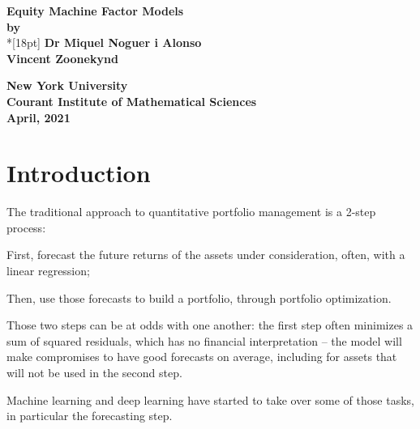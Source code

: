 \documentclass[12pt]{article}
\begin{document}
\begin{center}
\vspace*{.25in}
{\bf\LARGE  { Equity Machine Factor Models }}\\ %
\vspace*{.75in}
{\bf by} \\*[18pt]
\vspace*{.2in}
{\bf Dr Miquel Noguer i Alonso} \\
{\bf Vincent Zoonekynd} \\
\vspace*{1in}

{\bf New York University} \\
{\bf Courant Institute of Mathematical Sciences }\\
{\bf April, 2021} \\     %
\vspace*{.5in}

\end{center}

\newpage 
\newtheorem{definition}{Definition}[section]
\clearpage

\section{Introduction}

The traditional approach to quantitative portfolio management is a 2-step process:
\begin{compactitem}[--]
\item First, forecast the future returns of the assets under consideration, 
  often, with a linear regression;
\item Then, use those forecasts to build a portfolio, through portfolio optimization.
\end{compactitem}

Those two steps can be at odds with one another: the first step often minimizes a sum of squared residuals,
which has no financial interpretation -- the model will make compromises to have good forecasts on average,
including for assets that will not be used in the second step.

Machine learning and deep learning have started to take over some of those tasks, in particular the forecasting step.
\end{document}
